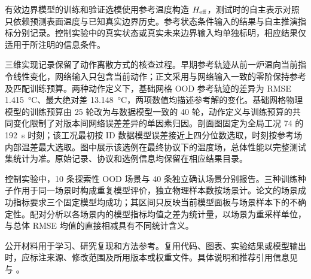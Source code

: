 
有效边界模型的训练和验证选模使用参考温度构造 ${H_{\mathrm{eff}}}$，测试时的自主表示对照只依赖预测表面温度与已知真实边界历史。参考状态条件输入的结果与自主推演指标分别记录。控制实验中的真实状态或真实未来边界输入均单独标明，相应结果仅适用于所注明的信息条件。

三维实现记录保留了动作离散方式的核查过程。早期参考轨迹从前一炉温向当前指令线性变化，网络输入只包含当前动作；正文采用与网络输入一致的零阶保持参考及匹配训练预算。两种动作定义下，基础网格 OOD 参考轨迹的差异为 RMSE \SI{1.415}{\degreeCelsius}、最大绝对差 \SI{13.148}{\degreeCelsius}，两项数值均描述参考解的变化。基础网格物理模型的训练预算由 25 轮改为与数据模型一致的 40 轮，动作定义与训练预算的共同变化限制了对版本间网络误差差异的单因素归因。剖面图固定为全局工况 74 的 \SI{192}{\second} 时刻；该工况最初按 ID 数据模型误差接近上四分位数选取，时刻按参考场内部温差最大选取。图中展示该选例在最终协议下的温度场，总体性能以完整测试集统计为准。原始记录、协议和选例信息均保留在相应结果目录。

控制实验中，10 条探索性 OOD 场景与 40 条独立确认场景分别报告。三种训练种子作用于同一场景时构成重复模型评价，独立物理样本数按场景计。论文的场景成功指标要求三个固定模型均成功；其区间只反映当前模型面板与场景样本下的不确定性。配对分析以各场景内的模型指标均值之差为统计量，以场景为重采样单位，与总体 RMSE 均值的直接相减具有不同统计含义。


公开材料用于学习、研究复现和方法参考。复用代码、图表、实验结果或模型输出时，应标注来源、修改范围及所用版本或权重文件。具体说明和推荐引用信息见  与 。
